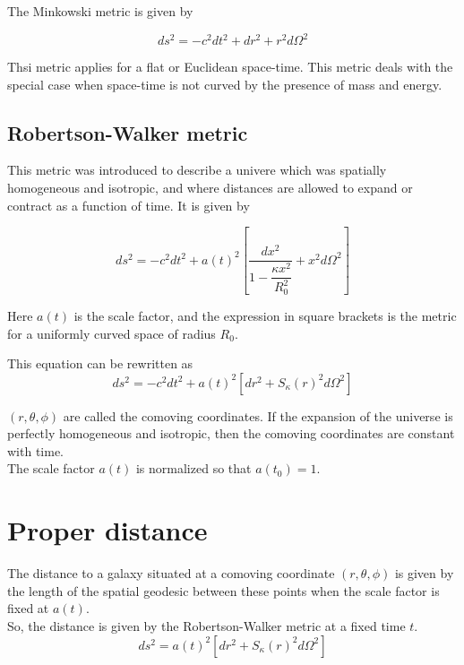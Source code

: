 \documentclass[a4,12pt,oneside]{report}
\begin{document}
	The Minkowski metric is given by
	
	\begin{equation}
		ds^2=-c^2dt^2+dr^2+r^2d\Omega^2
	\end{equation}
	
	Thsi metric applies for a flat or Euclidean space-time. This metric deals with the special case when space-time is not curved by the presence of mass and energy.
	
	\subsection{Robertson-Walker metric}
	
	This metric was introduced to describe a univere which was spatially homogeneous and isotropic, and where distances are allowed to expand or contract as a function of time. It is given by
	
	\begin{equation}
		ds^2=-c^2dt^2+a(t)^2\left[\frac{dx^2}{1-\dfrac{\kappa x^2}{R_0^2}} +x^2d\Omega^2\right]
	\end{equation}
	
	Here $a(t)$ is the scale factor, and the expression in square brackets is the metric for a uniformly curved space of radius $R_0$.

	This equation can be rewritten as 
	\begin{equation}
		ds^2=-c^2dt^2+a(t)^2[dr^2+S_\kappa(r)^2d\Omega^2]
	\end{equation}
	
	$ (r,\theta, \phi) $ are called the comoving coordinates. If the expansion of the universe is perfectly homogeneous and isotropic, then the comoving coordinates are constant with time. \\
	
	The scale factor $ a(t) $ is normalized so that $ a(t_0) =1$.
	
	\section{Proper distance}
	The distance to a galaxy situated at a comoving coordinate $ (r,\theta,\phi) $ is given by the length of the spatial geodesic between these points when the scale factor is fixed at $ a(t) $. \\
	
	So, the distance is given by the Robertson-Walker metric at a fixed time $ t $.
	\begin{equation}
		ds^2=a(t)^2[dr^2+S_\kappa(r)^2d\Omega^2]
	\end{equation}
	
\end{document}
